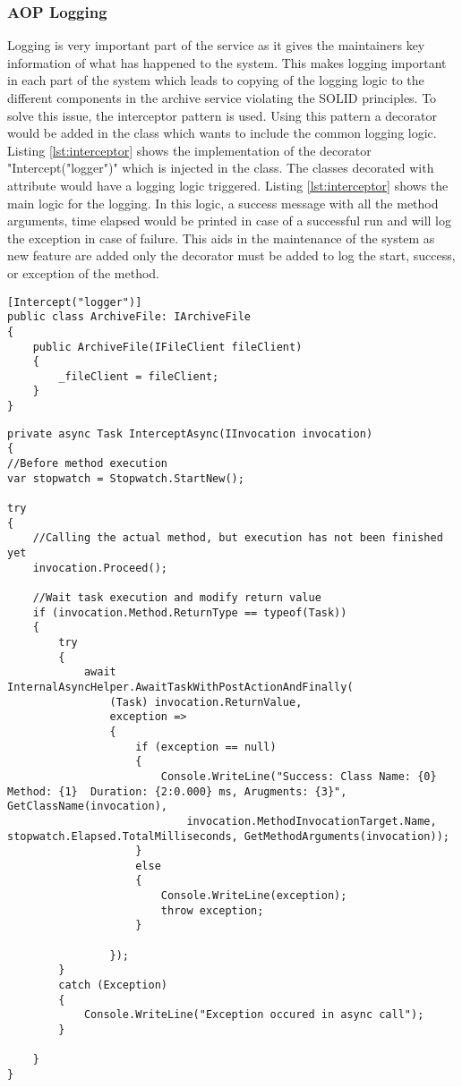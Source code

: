 \subsubsection{AOP Logging}
Logging is very important part of the service as it gives the maintainers key information of what has happened to the system. This makes logging important
in each part of the system which leads to copying of the logging logic to the different components in the archive service violating the SOLID \cite{Hotop2015} principles. 
To solve this issue, the interceptor pattern is used. Using this pattern a decorator would be added in the class which wants to include the common
logging logic. Listing \ref{lst:interceptor} shows the implementation of the decorator "Intercept("logger")" which is injected in the class. The 
classes decorated with attribute would have a logging logic triggered. Listing \ref{lst:interceptor} shows the main logic for the logging. In this logic, a success message
with all the method arguments, time elapsed would be printed in case of a successful run and will log the exception in case of failure. This aids in the maintenance
of the system as new feature are added only the decorator must be added to log the start, success, or exception of the method.

\begin{lstlisting}[language={[Sharp]C}, caption={Interceptor decorator example}, captionpos=b,label={lst:interceptor}]
[Intercept("logger")]
public class ArchiveFile: IArchiveFile
{
    public ArchiveFile(IFileClient fileClient)
    {
        _fileClient = fileClient;
    }
}
\end{lstlisting}            

\begin{lstlisting}[language={[Sharp]C}, caption={Interceptor logger logic implementation}, captionpos=b,label={lst:interceptor}]
private async Task InterceptAsync(IInvocation invocation)
{
//Before method execution
var stopwatch = Stopwatch.StartNew();

try
{
    //Calling the actual method, but execution has not been finished yet
    invocation.Proceed();

    //Wait task execution and modify return value
    if (invocation.Method.ReturnType == typeof(Task))
    {
        try
        {
            await InternalAsyncHelper.AwaitTaskWithPostActionAndFinally(
                (Task) invocation.ReturnValue,
                exception =>
                {
                    if (exception == null)
                    {
                        Console.WriteLine("Success: Class Name: {0} Method: {1}  Duration: {2:0.000} ms, Arugments: {3}", GetClassName(invocation),
                            invocation.MethodInvocationTarget.Name, stopwatch.Elapsed.TotalMilliseconds, GetMethodArguments(invocation));
                    }
                    else
                    {
                        Console.WriteLine(exception);
                        throw exception;
                    }
                    
                });
        }
        catch (Exception)
        {
            Console.WriteLine("Exception occured in async call");
        }
        
    }
}
\end{lstlisting}            
